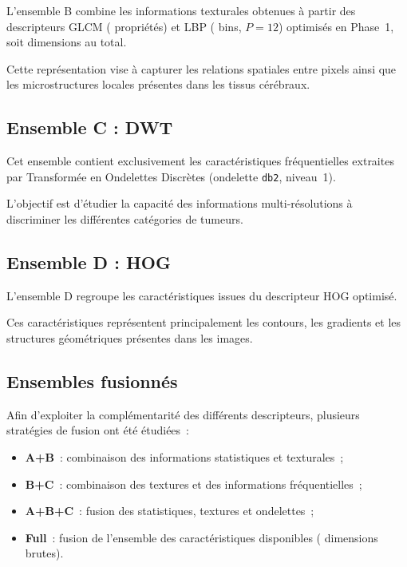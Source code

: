 L'ensemble B combine les informations texturales obtenues à partir des descripteurs GLCM
(\dimGLCM{} propriétés) et LBP (\dimLBP{} bins, $P=12$) optimisés en Phase~1, soit
\dimTexture{} dimensions au total.

Cette représentation vise à capturer les relations spatiales entre pixels ainsi que les
microstructures locales présentes dans les tissus cérébraux.

\subsection{Ensemble C : DWT}

Cet ensemble contient exclusivement les \dimDWT{} caractéristiques fréquentielles extraites
par Transformée en Ondelettes Discrètes (ondelette \texttt{db2}, niveau~1).

L'objectif est d'étudier la capacité des informations multi-résolutions à discriminer les
différentes catégories de tumeurs.

\subsection{Ensemble D : HOG}

L'ensemble D regroupe les \dimHOG{} caractéristiques issues du descripteur HOG optimisé.

Ces caractéristiques représentent principalement les contours, les gradients et les
structures géométriques présentes dans les images.

\subsection{Ensembles fusionnés}

Afin d'exploiter la complémentarité des différents descripteurs, plusieurs stratégies de
fusion ont été étudiées~:
\begin{itemize}[leftmargin=1.4em,itemsep=2pt]
  \item \textbf{A+B}~: combinaison des informations statistiques et texturales~;
  \item \textbf{B+C}~: combinaison des textures et des informations fréquentielles~;
  \item \textbf{A+B+C}~: fusion des statistiques, textures et ondelettes~;
  \item \textbf{Full}~: fusion de l'ensemble des caractéristiques disponibles
        (\dimFull{} dimensions brutes).
\end{itemize}

